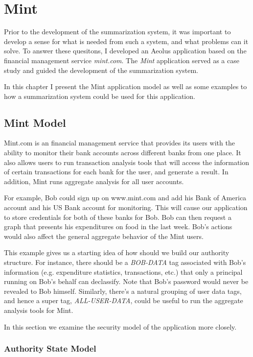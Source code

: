 \chapter{Mint}\label{mint}

Prior to the development of the summarization system, it was important to develop a sense for what is needed from such a system, and what problems can it solve. To answer these quesitons, I developed an Aeolus application based on the financial management service \emph{mint.com}. The \emph{Mint} application served as a case study and guided the development of the summarization system.

In this chapter I present the Mint application model as well as some examples to how a summarization system could be used for this application.

\section{Mint Model}

Mint.com is an financial management service that provides its users with the ability to monitor their bank accounts across different banks from one place. It also allows users to run transaction analysis tools that will access the information of certain transactions for each bank for the user, and generate a result. In addition, Mint runs aggregate analysis for all user accounts.

For example, Bob could sign up on www.mint.com and add his Bank of America account and his US Bank account for monitoring. This will cause our application to store credentials for both of these banks for Bob. Bob can then request a graph that presents his expenditures on food in the last week. Bob's actions would also affect the general aggregate behavior of the Mint users.

This example gives us a starting idea of how should we build our authority structure. For instance, there should be a \emph{BOB-DATA} tag associated with Bob's information (e.g. expenditure statistics, transactions, etc.) that only a principal running on Bob's behalf can declassify. Note that Bob's password would never be revealed to Bob himself. Similarly, there's a natural grouping of user data tags, and hence a super tag, \emph{ALL-USER-DATA}, could be useful to run the aggregate analysis tools for Mint.

In this section we examine the security model of the application more closely.

\subsection{Authority State Model}


